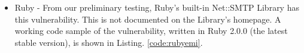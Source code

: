 \begin{itemize}
	\item Ruby - From our preliminary testing, Ruby's built-in Net::SMTP Library has this vulnerability. This is not documented on the Library's homepage.
	A working code sample of the vulnerability, written in Ruby 2.0.0 (the latest stable version), is shown in Listing. \ref{code:rubyemi}.
	
	
	
\end{itemize}